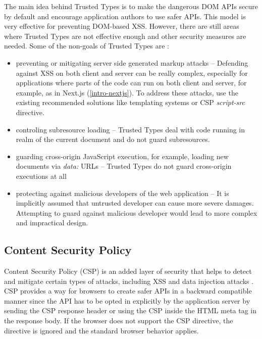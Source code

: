 The main idea behind Trusted Types is to make the dangerous DOM APIs secure by default and encourage
application authors to use safer APIs. This model is very effective for preventing DOM-based XSS.
However, there are still areas where Trusted Types are not effective enough and other security
measures are needed. Some of the non-goals of Trusted Types are \cite{tt_spec:non_goals}:

\begin{itemize}
  \item preventing or mitigating server side generated markup attacks -- Defending against XSS on
        both client and server can be really complex, especially for applications where parts of the
        code can run on both client and server, for example, as in Next.js (\ref{intro-nextjs}). To
        address these attacks, use the existing recommended solutions like templating systems or CSP
        \emph{script-src} directive.
  \item controling subresource loading -- Trusted Types deal with code running in realm of the
        current document and do not guard subresources.
  \item guarding cross-origin JavaScript execution, for example, loading new documents via
        \emph{data:} URLs -- Trusted Types do not guard cross-origin executions at all
  \item protecting against malicious developers of the web application -- It is implicitly assumed
        that untrusted developer can cause more severe damages. Attempting to guard against
        malicious developer would lead to more complex and impractical design.
\end{itemize}

\subsection{Content Security Policy}
\label{csp}

Content Security Policy (CSP) is an added layer of security that helps to detect and mitigate
certain types of attacks, including XSS and data injection attacks \cite{mdn_csp_def}. CSP provides
a way for browsers to create safer APIs in a backward compatible manner since the API has to be
opted in explicitly by the application server by sending the CSP response header or using the CSP
inside the HTML meta tag in the response body. If the browser does not support the CSP directive,
the directive is ignored and the standard browser behavior applies.

